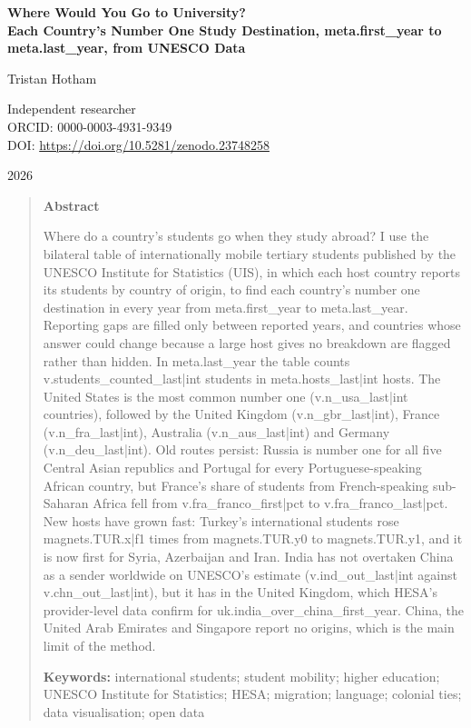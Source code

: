 \documentclass[11pt,a4paper]{article}
\begin{document}
\begin{center}
{\Large\bfseries Where Would You Go to University?\\[2pt] Each Country's Number One Study Destination, {{meta.first_year}} to {{meta.last_year}}, from UNESCO Data\par}
\vspace{1.2em}
{\large Tristan Hotham\par}
\vspace{0.3em}
{\small Independent researcher\\
ORCID: 0000-0003-4931-9349\\
DOI: \href{https://doi.org/10.5281/zenodo.23748258}{https://doi.org/10.5281/zenodo.23748258}\par}
\vspace{0.8em}
2026
\end{center}

\begin{quote}
\small
\begin{center}\textbf{Abstract}\end{center}
Where do a country's students go when they study abroad? I use the bilateral table of internationally mobile tertiary students published by the UNESCO Institute for Statistics (UIS), in which each host country reports its students by country of origin, to find each country's number one destination in every year from {{meta.first_year}} to {{meta.last_year}}. Reporting gaps are filled only between reported years, and countries whose answer could change because a large host gives no breakdown are flagged rather than hidden. In {{meta.last_year}} the table counts {{v.students_counted_last|int}} students in {{meta.hosts_last|int}} hosts. The United States is the most common number one ({{v.n_usa_last|int}} countries), followed by the United Kingdom ({{v.n_gbr_last|int}}), France ({{v.n_fra_last|int}}), Australia ({{v.n_aus_last|int}}) and Germany ({{v.n_deu_last|int}}). Old routes persist: Russia is number one for all five Central Asian republics and Portugal for every Portuguese-speaking African country, but France's share of students from French-speaking sub-Saharan Africa fell from {{v.fra_franco_first|pct}} to {{v.fra_franco_last|pct}}. New hosts have grown fast: Turkey's international students rose {{magnets.TUR.x|f1}} times from {{magnets.TUR.y0}} to {{magnets.TUR.y1}}, and it is now first for Syria, Azerbaijan and Iran. India has not overtaken China as a sender worldwide on UNESCO's estimate ({{v.ind_out_last|int}} against {{v.chn_out_last|int}}), but it has in the United Kingdom, which HESA's provider-level data confirm for {{uk.india_over_china_first_year}}. China, the United Arab Emirates and Singapore report no origins, which is the main limit of the method.

\textbf{Keywords:} international students; student mobility; higher education; UNESCO Institute for Statistics; HESA; migration; language; colonial ties; data visualisation; open data
\end{quote}
\end{document}
